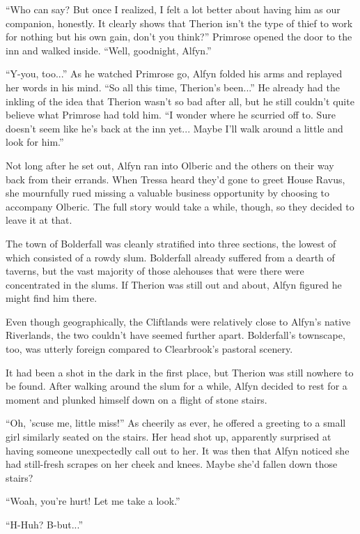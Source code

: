``Who can say? But once I realized, I felt a lot better about having him as our companion, honestly. It clearly shows that Therion isn't the type of thief to work for nothing but his own gain, don't you think?'' Primrose opened the door to the inn and walked inside. ``Well, goodnight, Alfyn.''

``Y-you, too...'' As he watched Primrose go, Alfyn folded his arms and replayed her words in his mind. ``So all this time, Therion's been...'' He already had the inkling of the idea that Therion wasn't so bad after all, but he still couldn't quite believe what Primrose had told him. ``I wonder where he scurried off to. Sure doesn't seem like he's back at the inn yet... Maybe I'll walk around a little and look for him.''

Not long after he set out, Alfyn ran into Olberic and the others on their way back from their errands. When Tressa heard they'd gone to greet House Ravus, she mournfully rued missing a valuable business opportunity by choosing to accompany Olberic. The full story would take a while, though, so they decided to leave it at that.

The town of Bolderfall was cleanly stratified into three sections, the lowest of which consisted of a rowdy slum. Bolderfall already suffered from a dearth of taverns, but the vast majority of those alehouses that were there were concentrated in the slums. If Therion was still out and about, Alfyn figured he might find him there.

Even though geographically, the Cliftlands were relatively close to Alfyn's native Riverlands, the two couldn't have seemed further apart. Bolderfall's townscape, too, was utterly foreign compared to Clearbrook's pastoral scenery. 

It had been a shot in the dark in the first place, but Therion was still nowhere to be found. After walking around the slum for a while, Alfyn decided to rest for a moment and plunked himself down on a flight of stone stairs.

``Oh, 'scuse me, little miss!'' As cheerily as ever, he offered a greeting to a small girl similarly seated on the stairs. Her head shot up, apparently surprised at having someone unexpectedly call out to her. It was then that Alfyn noticed she had still-fresh scrapes on her cheek and knees. Maybe she'd fallen down those stairs?

``Woah, you're hurt! Let me take a look.''

``H-Huh? B-but...''

